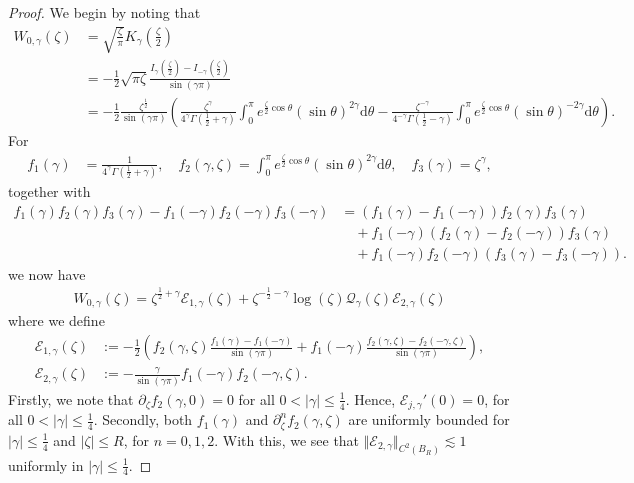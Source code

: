 \documentclass[11pt,reqno]{amsproc}
\theoremstyle{definition}
\numberwithin{equation}{section}
\newcommand{\E}{{\mathcal E}}
\newcommand{\Q}{{\mathcal{Q}}}
\renewcommand{\d}{\mathrm{d}}
\begin{document}
\begin{proof}
We begin by noting that 
\begin{align*}
W_{0,\gamma}(\zeta) &= \sqrt{\frac{\zeta}{\pi}}K_{\gamma}(\tfrac{\zeta}{2}) \\
&= -\frac12 \sqrt{\pi\zeta}\frac{I_\gamma(\tfrac{\zeta}{2})- I_{-\gamma}(\tfrac{\zeta}{2})}{\sin(\gamma\pi)} \\
&= -\frac12 \frac{\zeta^\frac12}{\sin(\gamma\pi)} \left( \frac{\zeta^\gamma}{4^\gamma \Gamma\left( \frac12 + \gamma \right)} \int_0^\pi e^{\frac{\zeta}{2} \cos\theta } (\sin \theta)^{2\gamma} \d \theta -  \frac{\zeta^{-\gamma}}{4^{-\gamma} \Gamma\left( \frac12 - \gamma \right)} \int_0^\pi e^{\frac{\zeta}{2} \cos\theta } (\sin \theta)^{-2\gamma} \d \theta \right).
\end{align*}
For 
\begin{align*}
f_1(\gamma)&=\frac{1}{4^{\gamma}\Gamma(\tfrac12+\gamma)}, \quad f_2(\gamma,\zeta) =\int_0^\pi e^{\frac{\zeta}{2} \cos\theta } (\sin \theta)^{2\gamma} \d \theta,  \quad f_3(\gamma) = \zeta^\gamma,
\end{align*}
together with
\begin{align*}
f_1(\gamma)f_2(\gamma)f_3(\gamma) -  f_1(-\gamma) f_2(-\gamma)f_3(-\gamma) &= \left( f_1(\gamma) - f_1(-\gamma) \right) f_2(\gamma) f_3(\gamma) \\
&\quad + f_1(-\gamma) \left( f_2(\gamma) - f_2(-\gamma) \right) f_3(\gamma) \\
&\quad + f_1(-\gamma)f_2(-\gamma) \left( f_3(\gamma) - f_3(-\gamma) \right).
\end{align*}
we now have
\begin{align*}
W_{0,\gamma}(\zeta) = \zeta^{\frac12+\gamma} \E_{1,\gamma}(\zeta) + \zeta^{-\frac12-\gamma}\log(\zeta)\Q_\gamma(\zeta) \E_{2,\gamma}(\zeta)
\end{align*}
where we define
\begin{align*}
\E_{1,\gamma}(\zeta) &:= -\frac12 \left( f_2(\gamma,\zeta) \frac{f_1(\gamma) - f_1(-\gamma)}{\sin(\gamma\pi)} + f_1(-\gamma) \frac{f_2(\gamma,\zeta) - f_2(-\gamma,\zeta)}{\sin(\gamma\pi)} \right), \\
\E_{2,\gamma}(\zeta) &:= -\frac{\gamma}{\sin(\gamma\pi)} f_1(-\gamma)f_2(-\gamma,\zeta).
\end{align*}
Firstly, we note that $\partial_\zeta f_2(\gamma,0)=0$ for all $0<|\gamma|\leq\tfrac14$. Hence, $\E_{j,\gamma}'(0) = 0$, for all $0<|\gamma|\leq\tfrac14$. Secondly, both $f_1(\gamma)$ and $\partial_\zeta^n f_2(\gamma,\zeta)$ are uniformly bounded for $|\gamma|\leq \tfrac14$ and $|\zeta|\leq R$, for $n=0,1,2$. With this, we see that $\Vert \E_{2,\gamma}\Vert_{C^2(B_R)}\lesssim 1$ uniformly in $|\gamma|\leq\tfrac14$.


\end{proof}
\end{document}
